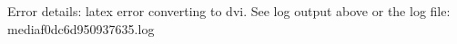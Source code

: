 \documentclass[preview]{standalone}
\begin{document}
\begin{center}
Error details: latex error converting to dvi. See log output above or the log file: media\Tex\0f0dc6d950937635.log
\end{center}
\end{document}
